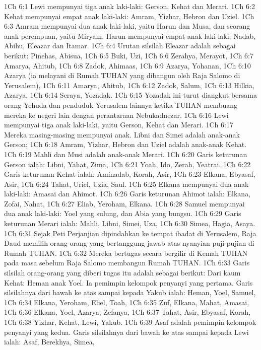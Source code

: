 1Ch 6:1  Lewi mempunyai tiga anak laki-laki: Gerson, Kehat dan Merari.
1Ch 6:2  Kehat mempunyai empat anak laki-laki: Amram, Yizhar, Hebron dan Uziel.
1Ch 6:3  Amram mempunyai dua anak laki-laki, yaitu Harun dan Musa, dan seorang anak perempuan, yaitu Miryam. Harun mempunyai empat anak laki-laki: Nadab, Abihu, Eleazar dan Itamar.
1Ch 6:4  Urutan silsilah Eleazar adalah sebagai berikut: Pinehas, Abisua,
1Ch 6:5  Buki, Uzi,
1Ch 6:6  Zerahya, Merayot,
1Ch 6:7  Amarya, Ahitub,
1Ch 6:8  Zadok, Ahimaas,
1Ch 6:9  Azarya, Yohanan,
1Ch 6:10  Azarya (ia melayani di Rumah TUHAN yang dibangun oleh Raja Salomo di Yerusalem),
1Ch 6:11  Amarya, Ahitub,
1Ch 6:12  Zadok, Salum,
1Ch 6:13  Hilkia, Azarya,
1Ch 6:14  Seraya, Yozadak.
1Ch 6:15  Yozadak ini turut diangkut bersama orang Yehuda dan penduduk Yerusalem lainnya ketika TUHAN membuang mereka ke negeri lain dengan perantaraan Nebukadnezar.
1Ch 6:16  Lewi mempunyai tiga anak laki-laki, yaitu Gerson, Kehat dan Merari.
1Ch 6:17  Mereka masing-masing mempunyai anak. Libni dan Simei adalah anak-anak Gerson;
1Ch 6:18  Amram, Yizhar, Hebron dan Uziel adalah anak-anak Kehat.
1Ch 6:19  Mahli dan Musi adalah anak-anak Merari.
1Ch 6:20  Garis keturunan Gerson ialah: Libni, Yahat, Zima,
1Ch 6:21  Yoah, Ido, Zerah, Yeatrai.
1Ch 6:22  Garis keturunan Kehat ialah: Aminadab, Korah, Asir,
1Ch 6:23  Elkana, Ebyasaf, Asir,
1Ch 6:24  Tahat, Uriel, Uzia, Saul.
1Ch 6:25  Elkana mempunyai dua anak laki-laki: Amasai dan Ahimot.
1Ch 6:26  Garis keturunan Ahimot ialah: Elkana, Zofai, Nahat,
1Ch 6:27  Eliab, Yeroham, Elkana.
1Ch 6:28  Samuel mempunyai dua anak laki-laki: Yoel yang sulung, dan Abia yang bungsu.
1Ch 6:29  Garis keturunan Merari ialah: Mahli, Libni, Simei, Uza,
1Ch 6:30  Simea, Hagia, Asaya.
1Ch 6:31  Sejak Peti Perjanjian dipindahkan ke tempat ibadat di Yerusalem, Raja Daud memilih orang-orang yang bertanggung jawab atas nyanyian puji-pujian di Rumah TUHAN.
1Ch 6:32  Mereka bertugas secara bergilir di Kemah TUHAN pada masa sebelum Raja Salomo membangun Rumah TUHAN.
1Ch 6:33  Garis silsilah orang-orang yang diberi tugas itu adalah sebagai berikut: Dari kaum Kehat: Heman anak Yoel. Ia pemimpin kelompok penyanyi yang pertama. Garis silsilahnya dari bawah ke atas sampai kepada Yakub ialah: Heman, Yoel, Samuel,
1Ch 6:34  Elkana, Yeroham, Eliel, Toah,
1Ch 6:35  Zuf, Elkana, Mahat, Amasai,
1Ch 6:36  Elkana, Yoel, Azarya, Zefanya,
1Ch 6:37  Tahat, Asir, Ebyasaf, Korah,
1Ch 6:38  Yizhar, Kehat, Lewi, Yakub.
1Ch 6:39  Asaf adalah pemimpin kelompok penyanyi yang kedua. Garis silsilahnya dari bawah ke atas sampai kepada Lewi ialah: Asaf, Berekhya, Simea,
